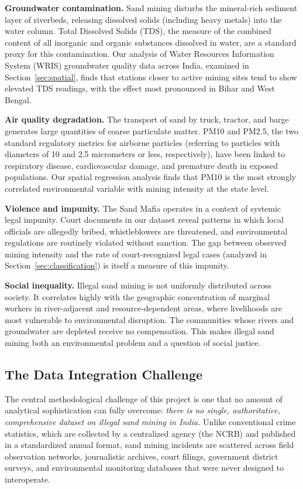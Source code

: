 \documentclass[12pt]{article}
\begin{document}
\textbf{Groundwater contamination.} Sand mining disturbs the mineral-rich sediment layer of riverbeds, releasing dissolved solids (including heavy metals) into the water column. Total Dissolved Solids (TDS), the measure of the combined content of all inorganic and organic substances dissolved in water, are a standard proxy for this contamination. Our analysis of Water Resources Information System (WRIS) groundwater quality data across India, examined in Section~\ref{sec:spatial}, finds that stations closer to active mining sites tend to show elevated TDS readings, with the effect most pronounced in Bihar and West Bengal.

\textbf{Air quality degradation.} The transport of sand by truck, tractor, and barge generates large quantities of coarse particulate matter. PM10 and PM2.5, the two standard regulatory metrics for airborne particles (referring to particles with diameters of 10 and 2.5 micrometers or less, respectively), have been linked to respiratory disease, cardiovascular damage, and premature death in exposed populations. Our spatial regression analysis finds that PM10 is the most strongly correlated environmental variable with mining intensity at the state level.

\textbf{Violence and impunity.} The Sand Mafia operates in a context of systemic legal impunity. Court documents in our dataset reveal patterns in which local officials are allegedly bribed, whistleblowers are threatened, and environmental regulations are routinely violated without sanction. The gap between observed mining intensity and the rate of court-recognized legal cases (analyzed in Section~\ref{sec:classification}) is itself a measure of this impunity.

\textbf{Social inequality.} Illegal sand mining is not uniformly distributed across society. It correlates highly with the geographic concentration of marginal workers in river-adjacent and resource-dependent areas, where livelihoods are most vulnerable to environmental disruption. The communities whose rivers and groundwater are depleted receive no compensation. This makes illegal sand mining both an environmental problem and a question of social justice.

\subsection{The Data Integration Challenge}
\label{sec:data_challenge}

The central methodological challenge of this project is one that no amount of analytical sophistication can fully overcome: \textit{there is no single, authoritative, comprehensive dataset on illegal sand mining in India.} Unlike conventional crime statistics, which are collected by a centralized agency (the NCRB) and published in a standardized annual format, sand mining incidents are scattered across field observation networks, journalistic archives, court filings, government district surveys, and environmental monitoring databases that were never designed to interoperate.
\end{document}
